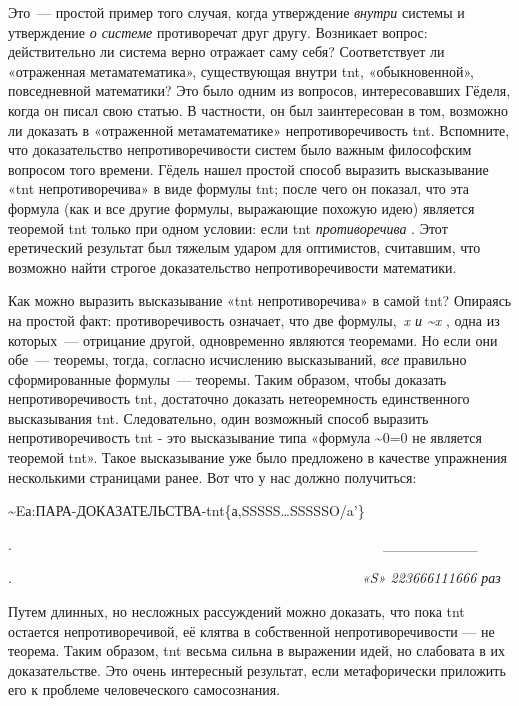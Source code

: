 \documentclass[../main.tex]{subfiles}
\begin{document}
Это~--- простой пример того случая, когда утверждение \emph{внутри} системы и утверждение \emph{о системе} противоречат друг другу. Возникает вопрос: действительно ли система верно отражает саму себя? Соответствует ли «отраженная метаматематика», существующая внутри \acs{tnt}, «обыкновенной», повседневной математики? Это было одним из вопросов, интересовавших Гёделя, когда он писал свою статью. В частности, он был заинтересован в том, возможно ли доказать в «отраженной метаматематике» непротиворечивость \acs{tnt}\@. Вспомните, что доказательство непротиворечивости систем было важным философским вопросом того времени. Гёдель нашел простой способ выразить высказывание «\acs{tnt} непротиворечива» в виде формулы \acs{tnt}; после чего он показал, что эта формула (как и все другие формулы, выражающие похожую идею) является теоремой \acs{tnt} только при одном условии: если \acs{tnt} \emph{противоречива} . Этот еретический результат был тяжелым ударом для оптимистов, считавшим, что возможно найти строгое доказательство непротиворечивости математики.

Как можно выразить высказывание «\acs{tnt} непротиворечива» в самой \acs{tnt}? Опираясь на простой факт: противоречивость означает, что две формулы,~\emph{x и \textasciitilde x} , одна из которых~--- отрицание другой, одновременно являются теоремами. Но если они обе~--- теоремы, тогда, согласно исчислению высказываний, \emph{все} правильно сформированные формулы~--- теоремы. Таким образом, чтобы доказать непротиворечивость \acs{tnt}, достаточно доказать нетеоремность единственного высказывания \acs{tnt}\@. Следовательно, один возможный способ выразить непротиворечивость \acs{tnt} - это высказывание типа «формула \textasciitilde0=0 не является теоремой \acs{tnt}». Такое высказывание уже было предложено в качестве упражнения несколькими страницами ранее. Вот что у нас должно получиться:

\textasciitilde Eа:ПАРА-ДОКАЗАТЕЛЬСТВА-\acs{tnt}\{а,SSSSS\ldots SSSSSO/a'\}

.~~~~~~~~~~~~~~~~~~~~~~~~~~~~~~~~~~~~~~~~~~~~~~~~~~~~~\textbar\_\_\_\_\_\_\_\_\_\textbar{}

.~~~~~~~~~~~~~~~~~~~~~~~~~~~~~~~~~~~~~~~~~~~~~~~~~~\emph{«S» 223666111666 раз}

Путем длинных, но несложных рассуждений можно доказать, что пока \acs{tnt} остается непротиворечивой, её клятва в собственной непротиворечивости --- не теорема. Таким образом, \acs{tnt} весьма сильна в выражении идей, но слабовата в их доказательстве. Это очень интересный результат, если метафорически приложить его к проблеме человеческого самосознания.
\end{document}
